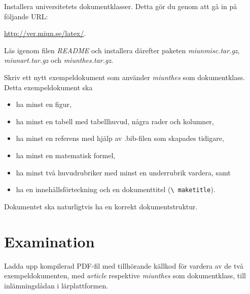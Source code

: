 \documentclass[a4paper]{miunasgn}
\begin{document}
Installera universitetets dokumentklasser.
Detta gör du genom att gå in på följande URL:
\begin{center}
	\url{http://ver.miun.se/latex/}.
\end{center}
Läs igenom filen \emph{README} och installera därefter paketen 
\emph{miunmisc.tar.gz}, \emph{miunart.tar.gz} och \emph{miunthes.tar.gz}.

Skriv ett nytt exempeldokument som använder \emph{miunthes} som dokumentklass.
Detta exempeldokument ska
\begin{itemize}
	\item ha minst en figur,
	\item ha minst en tabell med tabellhuvud, några rader och kolumner,
	\item ha minst en referens med hjälp av .bib-filen som skapades tidigare,
	\item ha minst en matematisk formel,
	\item ha minst två huvudrubriker med minst en underrubrik vardera, samt
	\item ha en innehållsförteckning och en dokumenttitel (\texttt{\textbackslash 
		maketitle}).
\end{itemize}
Dokumentet ska naturligtvis ha en korrekt dokumentstruktur.


\section{Examination}
\label{sec:Examination}
\noindent
Ladda upp kompilerad PDF-fil med tillhörande källkod för vardera av de två 
exempeldokumenten, med \emph{article} respektive \emph{miunthes} som 
dokumentklass, till inlämningslådan i lärplattformen.


\printbibliography
\end{document}
